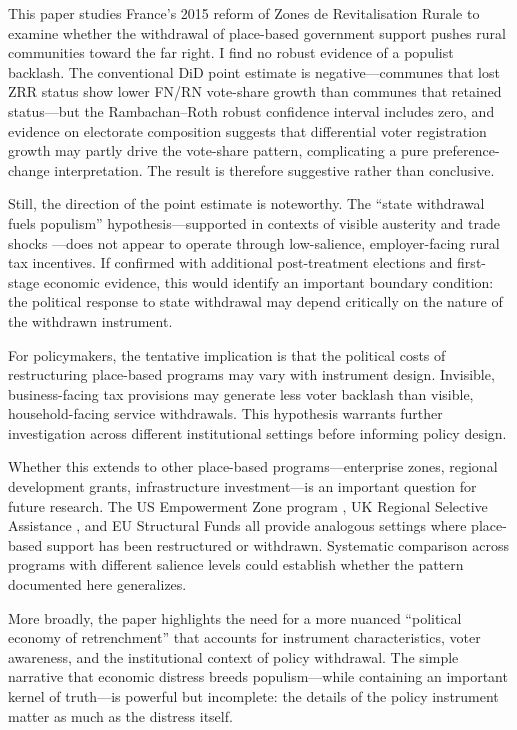 \documentclass[12pt]{article}
\begin{document}
This paper studies France's 2015 reform of Zones de Revitalisation Rurale to examine whether the withdrawal of place-based government support pushes rural communities toward the far right. I find no robust evidence of a populist backlash. The conventional DiD point estimate is negative---communes that lost ZRR status show lower FN/RN vote-share growth than communes that retained status---but the Rambachan--Roth robust confidence interval includes zero, and evidence on electorate composition suggests that differential voter registration growth may partly drive the vote-share pattern, complicating a pure preference-change interpretation. The result is therefore suggestive rather than conclusive.

Still, the direction of the point estimate is noteworthy. The ``state withdrawal fuels populism'' hypothesis---supported in contexts of visible austerity \citep{fetzer2019austerity} and trade shocks \citep{autor2020importing}---does not appear to operate through low-salience, employer-facing rural tax incentives. If confirmed with additional post-treatment elections and first-stage economic evidence, this would identify an important boundary condition: the political response to state withdrawal may depend critically on the nature of the withdrawn instrument.

For policymakers, the tentative implication is that the political costs of restructuring place-based programs may vary with instrument design. Invisible, business-facing tax provisions may generate less voter backlash than visible, household-facing service withdrawals. This hypothesis warrants further investigation across different institutional settings before informing policy design.

Whether this extends to other place-based programs---enterprise zones, regional development grants, infrastructure investment---is an important question for future research. The US Empowerment Zone program \citep{busso2013assessing}, UK Regional Selective Assistance \citep{criscuolo2019effects}, and EU Structural Funds all provide analogous settings where place-based support has been restructured or withdrawn. Systematic comparison across programs with different salience levels could establish whether the pattern documented here generalizes.

More broadly, the paper highlights the need for a more nuanced ``political economy of retrenchment'' that accounts for instrument characteristics, voter awareness, and the institutional context of policy withdrawal. The simple narrative that economic distress breeds populism---while containing an important kernel of truth---is powerful but incomplete: the details of the policy instrument matter as much as the distress itself.
\end{document}
